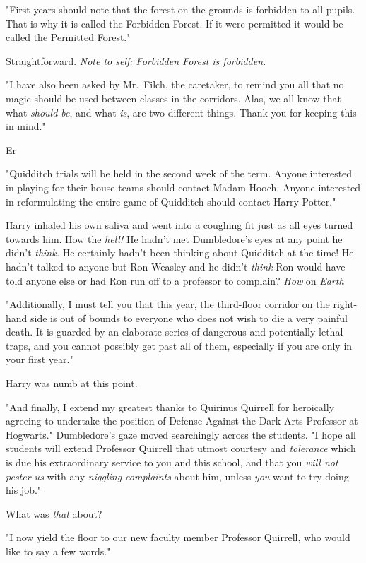 "First years should note that the forest on the grounds is forbidden to all
pupils. That is why it is called the Forbidden Forest. If it were permitted it
would be called the Permitted Forest."

Straightforward. \emph{Note to self: Forbidden Forest is forbidden.}

"I have also been asked by Mr.~Filch, the caretaker, to remind you all that no
magic should be used between classes in the corridors. Alas, we all know that
what \emph{should be}, and what \emph{is}, are two different things. Thank you
for keeping this in mind."

Er{\el}

"Quidditch trials will be held in the second week of the term. Anyone
interested in playing for their house teams should contact Madam Hooch. Anyone
interested in reformulating the entire game of Quidditch should contact Harry
Potter."

Harry inhaled his own saliva and went into a coughing fit just as all eyes
turned towards him. How the \emph{hell!} He hadn't met Dumbledore's eyes at any
point{\el} he didn't \emph{think.} He certainly hadn't been thinking about
Quidditch at the time! He hadn't talked to anyone but Ron Weasley and he didn't
\emph{think} Ron would have told anyone else{\el} or had Ron run off to a
professor to complain? \emph{How} on \emph{Earth{\el}}

"Additionally, I must tell you that this year, the third-floor corridor on the
right-hand side is out of bounds to everyone who does not wish to die a very
painful death. It is guarded by an elaborate series of dangerous and
potentially lethal traps, and you cannot possibly get past all of them,
especially if you are only in your first year."

Harry was numb at this point.

"And finally, I extend my greatest thanks to Quirinus Quirrell for heroically
agreeing to undertake the position of Defense Against the Dark Arts Professor
at Hogwarts." Dumbledore's gaze moved searchingly across the students. "I hope
all students will extend Professor Quirrell that utmost courtesy and
\emph{tolerance} which is due his extraordinary service to you and this school,
and that you \emph{will not pester us} with any \emph{niggling complaints}
about him, unless \emph{you} want to try doing his job."

What was \emph{that} about?

"I now yield the floor to our new faculty member Professor Quirrell, who would
like to say a few words."

